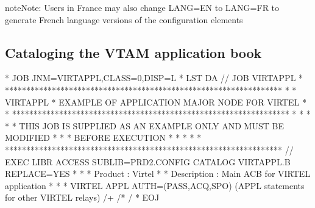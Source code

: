 \documentclass[letterpaper,10pt,english]{sphinxmanual}
\begin{document}
\begin{sphinxadmonition}{note}{Note:}
Users in France may also change LANG=EN to LANG=FR to generate French language versions of the configuration elements
\end{sphinxadmonition}


\subsection{Cataloging the VTAM application book}
\label{\detokenize{Installation_Guide:cataloging-the-vtam-application-book}}
\begin{sphinxVerbatim}[commandchars=\\\{\}]
* \PYGZdl{}\PYGZdl{} JOB JNM=VIRTAPPL,CLASS=0,DISP=L
* \PYGZdl{}\PYGZdl{} LST DA
// JOB VIRTAPPL
* *****************************************************************
* * VIRTAPPL * EXAMPLE OF APPLICATION MAJOR NODE FOR VIRTEL *
* *****************************************************************
* * *
* * THIS JOB IS SUPPLIED AS AN EXAMPLE ONLY AND MUST BE MODIFIED *
* * BEFORE EXECUTION *
* * *
* *****************************************************************
// EXEC LIBR
ACCESS SUBLIB=PRD2.CONFIG
CATALOG VIRTAPPL.B REPLACE=YES
* \PYGZhy{}\PYGZhy{}\PYGZhy{}\PYGZhy{}\PYGZhy{}\PYGZhy{}\PYGZhy{}\PYGZhy{}\PYGZhy{}\PYGZhy{}\PYGZhy{}\PYGZhy{}\PYGZhy{}\PYGZhy{}\PYGZhy{}\PYGZhy{}\PYGZhy{}\PYGZhy{}\PYGZhy{}\PYGZhy{}\PYGZhy{}\PYGZhy{}\PYGZhy{}\PYGZhy{}\PYGZhy{}\PYGZhy{}\PYGZhy{}\PYGZhy{}\PYGZhy{}\PYGZhy{}\PYGZhy{}\PYGZhy{}\PYGZhy{}\PYGZhy{}\PYGZhy{}\PYGZhy{}\PYGZhy{}\PYGZhy{}\PYGZhy{}\PYGZhy{}\PYGZhy{}\PYGZhy{}\PYGZhy{}\PYGZhy{}\PYGZhy{}\PYGZhy{}\PYGZhy{}\PYGZhy{}\PYGZhy{}\PYGZhy{}\PYGZhy{}\PYGZhy{}\PYGZhy{}\PYGZhy{}\PYGZhy{}\PYGZhy{}\PYGZhy{}\PYGZhy{}\PYGZhy{}\PYGZhy{}\PYGZhy{}\PYGZhy{}\PYGZhy{}\PYGZhy{}\PYGZhy{}\PYGZhy{} *
* Product : Virtel *
* Description : Main ACB for VIRTEL application *
* \PYGZhy{}\PYGZhy{}\PYGZhy{}\PYGZhy{}\PYGZhy{}\PYGZhy{}\PYGZhy{}\PYGZhy{}\PYGZhy{}\PYGZhy{}\PYGZhy{}\PYGZhy{}\PYGZhy{}\PYGZhy{}\PYGZhy{}\PYGZhy{}\PYGZhy{}\PYGZhy{}\PYGZhy{}\PYGZhy{}\PYGZhy{}\PYGZhy{}\PYGZhy{}\PYGZhy{}\PYGZhy{}\PYGZhy{}\PYGZhy{}\PYGZhy{}\PYGZhy{}\PYGZhy{}\PYGZhy{}\PYGZhy{}\PYGZhy{}\PYGZhy{}\PYGZhy{}\PYGZhy{}\PYGZhy{}\PYGZhy{}\PYGZhy{}\PYGZhy{}\PYGZhy{}\PYGZhy{}\PYGZhy{}\PYGZhy{}\PYGZhy{}\PYGZhy{}\PYGZhy{}\PYGZhy{}\PYGZhy{}\PYGZhy{}\PYGZhy{}\PYGZhy{}\PYGZhy{}\PYGZhy{}\PYGZhy{}\PYGZhy{}\PYGZhy{}\PYGZhy{}\PYGZhy{}\PYGZhy{}\PYGZhy{}\PYGZhy{}\PYGZhy{}\PYGZhy{}\PYGZhy{}\PYGZhy{} *
VIRTEL APPL AUTH=(PASS,ACQ,SPO)
  (APPL statements for other VIRTEL relays)
/+
/*
/\PYGZam{}
* \PYGZdl{}\PYGZdl{} EOJ
\end{sphinxVerbatim}
\end{document}
